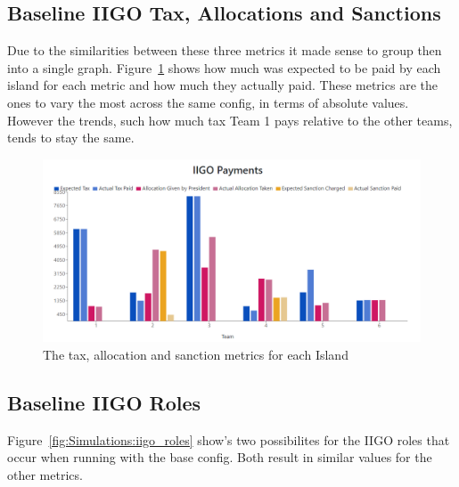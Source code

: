 \subsection{Baseline IIGO Tax, Allocations and Sanctions}
\label{subsec:Simulations:baseline:IIGO}

Due to the similarities between these three metrics it made sense to group then into a single graph. Figure~\ref{fig:Simulations:IIGO_numbers} shows how much was expected to be paid by each island for each metric and how much they actually paid. These metrics are the ones to vary the most across the same config, in terms of absolute values. However the trends, such how much tax Team 1 pays relative to the other teams, tends to stay the same.

\begin{figure}[H] 
    \centering
    \includegraphics[width=1\textwidth]{15_simulations/images/baseline_iigo_tax_alloc_sanction.png}
    \caption{The tax, allocation and sanction metrics for each Island}
    \label{fig:Simulations:IIGO_numbers}
\end{figure} 
    

\subsection{Baseline IIGO Roles}
\label{subsec:Simulations:baseline:IIGO_roles}

Figure~\ref{fig:Simulations:iigo_roles} show's two possibilites for the IIGO roles that occur when running with the base config. Both result in similar values for the other metrics.

